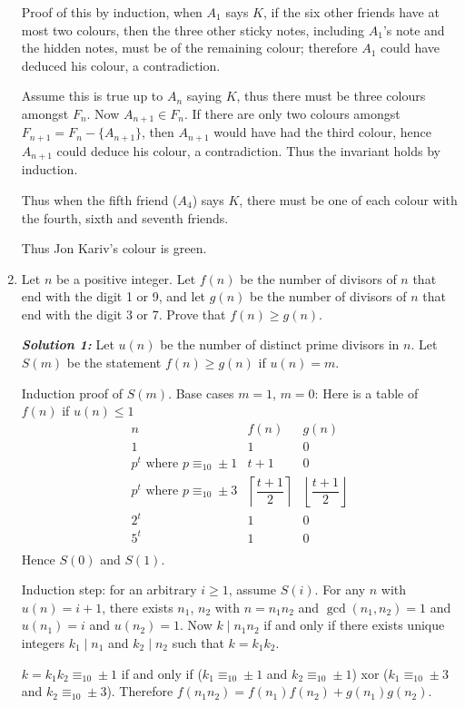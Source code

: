 \documentclass[12pt]{article}
\newcommand{\solnum}[1]{\textbf{\textit{Solution #1: }}}
\begin{document}
\begin{enumerate}[topsep=\bigskipamount,itemsep=\bigskipamount,leftmargin=0pt]
Proof of this by induction,
when $A_1$ says $K$,
if the six other friends have at most two colours,
then the three other sticky notes,
including $A_1$'s note and the hidden notes,
must be of the remaining colour;
therefore $A_1$ could have deduced his colour,
a contradiction.

Assume this is true up to $A_n$ saying $K$,
thus there must be three colours amongst $F_n$.
Now $A_{n+1}\in F_n$.
If there are only two colours amongst 
$F_{n+1} = F_n-\{A_{n+1}\}$,
then $A_{n+1}$ would have had the third colour,
hence $A_{n+1}$ could deduce his colour,
a contradiction.
Thus the invariant holds by induction.

Thus when the fifth friend ($A_4$) says $K$,
there must be one of each colour with the fourth, sixth and seventh friends.

Thus Jon Kariv's colour is green.

\item %
Let $n$ be a positive integer.
Let $f(n)$ be the number of divisors of $n$ that end with the digit 1 or 9, and let $g(n)$ be the number of divisors of $n$ that end with the digit 3 or 7.
Prove that $f(n) \geqslant g(n)$.

\solnum{1}
Let $u(n)$ be the number of distinct prime divisors in $n$.
Let $S(m)$ be the statement $f(n)\geq g(n)$ if $u(n) = m$.

Induction proof of $S(m)$.
Base cases $m = 1$, $m=0$:
Here is a table of $f(n)$ if $u(n)\leq 1$
$$\begin{array}{l|c|c}
    n & f(n) & g(n)\\ \hline
    1 & 1 & 0\\
    p^t \text{ where } p\equiv_{10} \pm 1 & t+1 & 0\\
    p^t \text{ where } p\equiv_{10} \pm 3 & \left\lceil \dfrac{t+1}{2} \right\rceil & \left\lfloor \dfrac{t+1}{2} \right\rfloor\\
    2^t  & 1 & 0\\
    5^t  & 1 & 0\\
\end{array}$$
Hence $S(0)$ and $S(1)$.

Induction step: for an arbitrary $i\geq 1$, assume $S(i)$.
For any $n$ with $u(n) = i+1$, there exists $n_1$, $n_2$ with $n=n_1 n_2$ and $\gcd(n_1, n_2) = 1$ and $u(n_1)= i$ and $u(n_2)= 1$.
Now $k\mid n_1 n_2$ if and only if there exists unique integers $k_1\mid n_1$ and $k_2\mid n_2$ such that $k = k_1 k_2$.

$k = k_1 k_2\equiv_{10} \pm 1$ if and only if ($k_1\equiv_{10} \pm 1$ and $k_2\equiv_{10} \pm 1$) xor ($k_1\equiv_{10} \pm 3$ and $k_2\equiv_{10} \pm 3$).
Therefore $f(n_1 n_2) = f(n_1) f(n_2) + g(n_1) g(n_2)$.


\end{enumerate}
\end{document}
